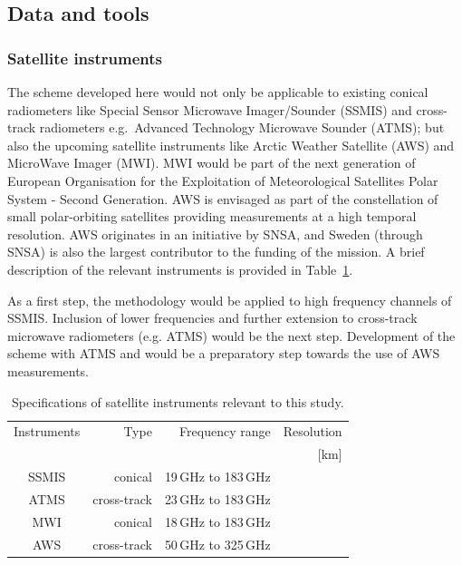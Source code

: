 \documentclass[12pt,oneside,a4paper]{article}
\begin{document}

\subsection{Data and tools}
%
 
\subsubsection{Satellite instruments}

The scheme developed here would not only be applicable to existing conical radiometers like  Special Sensor Microwave Imager/Sounder (SSMIS) and cross-track radiometers e.g.\, Advanced Technology Microwave Sounder (ATMS); but also the upcoming satellite instruments like Arctic Weather Satellite (AWS) and MicroWave Imager (MWI). MWI would be part of the next generation of European Organisation for the Exploitation of Meteorological Satellites Polar System - Second Generation. AWS is envisaged as part of the constellation of small polar-orbiting satellites providing measurements at a high temporal resolution. AWS originates in an initiative by SNSA, and Sweden (through SNSA) is also the largest contributor to the funding of the mission. A brief description of the relevant instruments is provided in Table~\ref{tab:specifications_instruments}. 

As a first step, the methodology would be applied to high frequency channels of SSMIS. Inclusion of lower frequencies and further extension to cross-track microwave radiometers (e.g. ATMS) would be the next step. Development of the scheme with ATMS and would be a preparatory step towards the use of AWS measurements. 

\begin{table}[t]
	\caption{Specifications of satellite instruments relevant to this study.}
	\label{tab:specifications_instruments}	
	\begin{tabular}{crrr}

		Instruments &Type& Frequency range 	& Resolution  \\
					&     & 					& [km]			\\
		\hline			
		SSMIS		&conical	&19\,GHz to 183\,GHz& \\
		ATMS        &cross-track&23\,GHz to 183\,GHz &\\
		\hline
		MWI         &conical     &18\,GHz to 183\,GHz&\\
		AWS         &cross-track &50\,GHz to 325\,GHz&\\ 
		
		\hline			

	\end{tabular}
\end{table}
\end{document}
